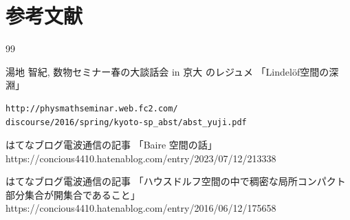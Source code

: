 \documentclass[leqno, a4paper, 12pt]{jsarticle}
\begin{document}
\section*{参考文献}


\renewcommand{\refname}{参考にしたウェブページ}

\begin{thebibliography}{99}

湯地 智紀, 
数物セミナー春の大談話会 in 京大 のレジュメ
「Lindel\"{o}f空間の深淵」
\begin{verbatim}http://physmathseminar.web.fc2.com/
discourse/2016/spring/kyoto-sp_abst/abst_yuji.pdf
\end{verbatim}

はてなブログ電波通信の記事
「Baire 空間の話」
https://concious4410.hatenablog.com/entry/2023/07/12/213338

はてなブログ電波通信の記事
「ハウスドルフ空間の中で稠密な局所コンパクト部分集合が開集合であること」
https://concious4410.hatenablog.com/entry/2016/06/12/175658
\end{thebibliography}



\renewcommand{\refname}{一般の参考文献}
\nocite{*}


\end{document}
